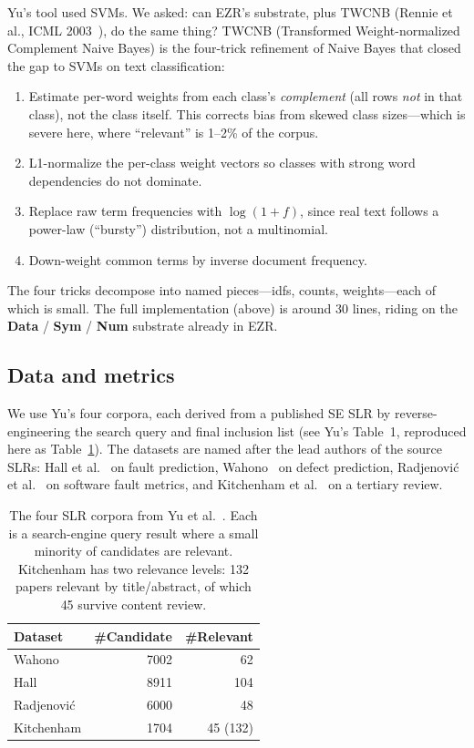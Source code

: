 \documentclass[AMA,STIX2COL]{WileyNJDv5}
\newcommand{\cls}[1]{%
  \setlength{\fboxsep}{1.5pt}%
  \colorbox{clsbg}{\sffamily\bfseries{#1}}%
}
\begin{document}
{Yu's tool used SVMs. We asked: can EZR's substrate, plus
TWCNB (Rennie et al., ICML 2003~\cite{rennie2003}), do the
same thing? TWCNB (Transformed Weight-normalized Complement
Naive Bayes) is the four-trick refinement of Naive Bayes that
closed the gap to SVMs on text classification:
\begin{enumerate}
\item Estimate per-word weights from each class's
{\em complement} (all rows {\em not} in that class),
not the class itself. This corrects bias from skewed class
sizes---which is severe here, where ``relevant'' is 1--2\% of
the corpus.
\item L1-normalize the per-class weight vectors so classes
with strong word dependencies do not dominate.
\item Replace raw term frequencies with $\log(1+f)$, since
real text follows a power-law (``bursty'') distribution, not
a multinomial.
\item Down-weight common terms by inverse document frequency.
\end{enumerate}
The four tricks decompose into named pieces---\textsf{idfs},
\textsf{counts}, \textsf{weights}---each of which is small.
The full implementation (above) is around 30 lines, riding on
the \cls{Data}/\cls{Sym}/\cls{Num} substrate already in EZR.

\subsection*{Data and metrics}

We use Yu's four corpora, each derived from a published SE
SLR by reverse-engineering the search query and final
inclusion list (see Yu's Table~1, reproduced here as
Table~\ref{slr}). The datasets are named after the lead
authors of the source SLRs: Hall et al.~\cite{hall2012} on
fault prediction, Wahono~\cite{wahono2015} on defect
prediction, Radjenovi\'c et al.~\cite{radjenovic2013} on
software fault metrics, and Kitchenham et al.\
\cite{kitchenham2010} on a tertiary review.

\begin{table}[!t]
\caption{The four SLR corpora from Yu et al.\
\cite{yu2018finding}. Each is a search-engine query result
where a small minority of candidates are relevant.
Kitchenham has two relevance levels: 132 papers relevant by
title/abstract, of which 45 survive content review.}
\label{slr}
\begin{center}
\footnotesize
\begin{tabular}{lrr}
\hline
Dataset & \#Candidate & \#Relevant \\
\hline
Wahono       & 7002 & 62 \\
Hall         & 8911 & 104 \\
Radjenovi\'c & 6000 & 48 \\
Kitchenham   & 1704 & 45 (132) \\
\hline
\end{tabular}
\end{center}
\end{table}

}
\end{document}
